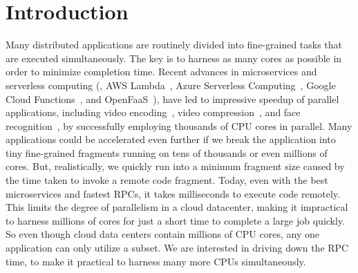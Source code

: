 \section{Introduction}
Many distributed applications are routinely divided into fine-grained tasks that are executed simultaneously.
The key is to harness as many cores as possible in order to minimize completion time.
Recent advances in microservices and serverless computing (\eg, AWS Lambda~\cite{aws-lambda}, Azure Serverless Computing~\cite{azure-functions}, Google Cloud Functions~\cite{gcloud-functions}, and OpenFaaS~\cite{openfaas}), have led to impressive speedup of parallel applications, including video encoding~\cite{ExCamera}, video compression~\cite{sprocket}, and face recognition~\cite{cirrus}, by successfully employing thousands of CPU cores in parallel. Many applications could be accelerated even further if we break the application into tiny fine-grained fragments running on tens of thousands or even millions of cores. 
But, realistically, we quickly run into a minimum fragment size caused by the time taken to invoke a remote code fragment. Today, even with the best microservices and fastest RPCs, it takes milliseconds to execute code remotely. This limits the degree of parallelism in a cloud datacenter, making it impractical to harness millions of cores for just a short time to complete a large job quickly.  So even though cloud data centers contain millions of CPU cores, any one application can only utilize a subset. We are interested in driving down the RPC time, to make it practical to harness many more CPUs simultaneously.


